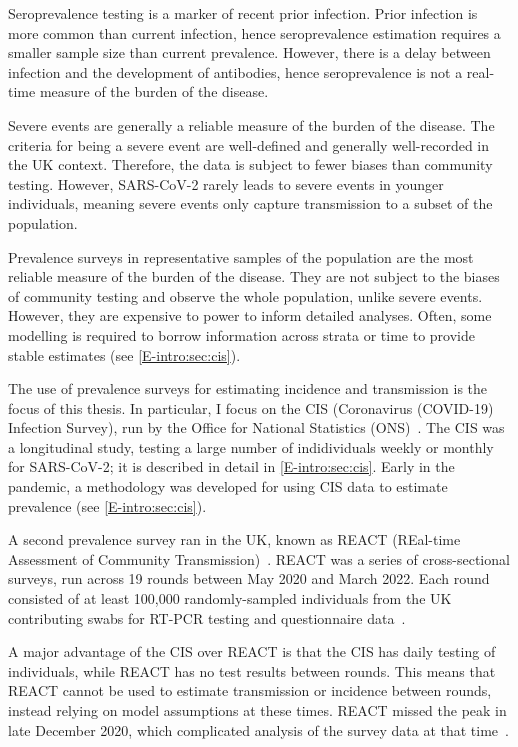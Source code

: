 \documentclass[thesis.tex]{subfiles}
\begin{document}
Seroprevalence testing is a marker of recent prior infection.
Prior infection is more common than current infection, hence seroprevalence estimation requires a smaller sample size than current prevalence.
However, there is a delay between infection and the development of antibodies, hence seroprevalence is not a real-time measure of the burden of the disease.

Severe events are generally a reliable measure of the burden of the disease.
The criteria for being a severe event are well-defined and generally well-recorded in the UK context.
Therefore, the data is subject to fewer biases than community testing.
However, SARS-CoV-2 rarely leads to severe events in younger individuals, meaning severe events only capture transmission to a subset of the population.

Prevalence surveys in representative samples of the population are the most reliable measure of the burden of the disease.
They are not subject to the biases of community testing and observe the whole population, unlike severe events.
However, they are expensive to power to inform detailed analyses.
Often, some modelling is required to borrow information across strata or time to provide stable estimates (see \cref{E-intro:sec:cis}).

The use of prevalence surveys for estimating incidence and transmission is the focus of this thesis.
In particular, I focus on the CIS (Coronavirus (COVID-19) Infection Survey), run by the Office for National Statistics (ONS)~\autocite{CIS,cisMethodsONS}.
The CIS was a longitudinal study, testing a large number of indidividuals weekly or monthly for SARS-CoV-2; it is described in detail in \cref{E-intro:sec:cis}.
Early in the pandemic, a methodology was developed for using CIS data to estimate prevalence (see \cref{E-intro:sec:cis}).

A second prevalence survey ran in the UK, known as REACT (REal-time Assessment of Community Transmission)~\autocite{rileyResurgence,rileyREACT}.
REACT was a series of cross-sectional surveys, run across 19 rounds between May 2020 and March 2022.
Each round consisted of at least 100,000 randomly-sampled individuals from the UK contributing swabs for RT-PCR testing and questionnaire data~\autocite{elliottTwin}.

A major advantage of the CIS over REACT is that the CIS has daily testing of individuals, while REACT has no test results between rounds.
This means that REACT cannot be used to estimate transmission or incidence between rounds, instead relying on model assumptions at these times.
REACT missed the peak in late December 2020, which complicated analysis of the survey data at that time~\autocite{rileyREACTround8}.
\end{document}
